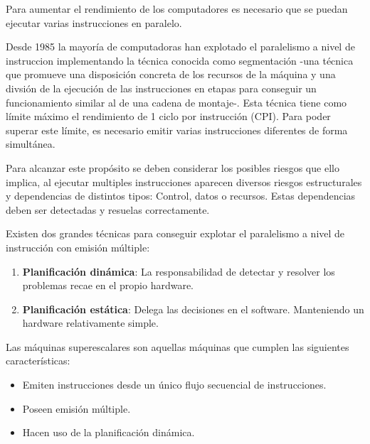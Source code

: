 Para aumentar el rendimiento de los computadores es necesario que se puedan ejecutar varias 
instrucciones en paralelo.

\bigskip
Desde 1985 la mayoría de computadoras han explotado el paralelismo a nivel de instruccion implementando
la técnica conocida como segmentación -una técnica que promueve una disposición concreta de los 
recursos de la máquina y una divsión de la ejecución de las instrucciones en etapas para conseguir 
un funcionamiento similar al de una cadena de montaje-. 
Esta técnica tiene como límite máximo  el rendimiento de 1 ciclo por instrucción (CPI). 
Para poder superar este límite, es necesario emitir varias instrucciones diferentes de 
forma simultánea.\cite{Hennessy:2011}

\bigskip
Para alcanzar este propósito se deben considerar los posibles riesgos que ello implica, al ejecutar multiples
instrucciones aparecen diversos riesgos estructurales y dependencias de distintos tipos: Control, datos o recursos. Estas 
dependencias deben ser detectadas y resuelas correctamente.

\bigskip
Existen dos grandes técnicas para conseguir explotar el paralelismo a nivel de instrucción con emisión múltiple:

\begin{enumerate}

\item \textbf{Planificación dinámica}: La responsabilidad de detectar y resolver los problemas recae
en el propio hardware.

\item \textbf{Planificación estática}: Delega las decisiones en el software. Manteniendo un hardware
relativamente simple.

\end{enumerate}

Las máquinas superescalares son aquellas máquinas que cumplen las siguientes características:

\begin{itemize}

\item Emiten instrucciones desde un único flujo secuencial de instrucciones.

\item Poseen emisión múltiple.

\item Hacen uso de la planificación dinámica.

\end{itemize}

